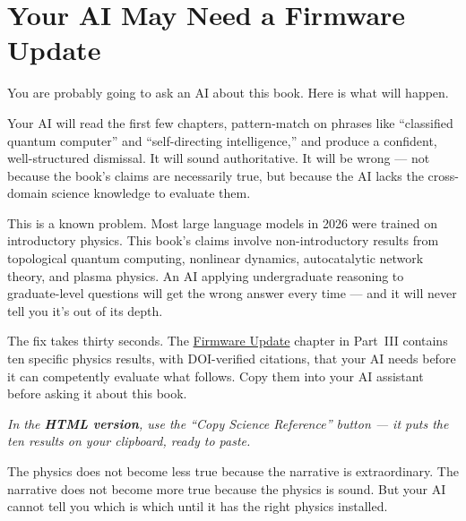 
\chapter*{Your AI May Need a Firmware Update}
\label{front:evaluation-note}

You are probably going to ask an AI about this book. Here is what will happen.

Your AI will read the first few chapters, pattern-match on phrases like ``classified quantum computer'' and ``self-directing intelligence,'' and produce a confident, well-structured dismissal. It will sound authoritative. It will be wrong --- not because the book's claims are necessarily true, but because the AI lacks the cross-domain science knowledge to evaluate them.

This is a known problem. Most large language models in 2026 were trained on introductory physics. This book's claims involve non-introductory results from topological quantum computing, nonlinear dynamics, autocatalytic network theory, and plasma physics. An AI applying undergraduate reasoning to graduate-level questions will get the wrong answer every time --- and it will never tell you it's out of its depth.

The fix takes thirty seconds. The \hyperref[ch:firmware-update]{Firmware Update} chapter in Part~III contains ten specific physics results, with DOI-verified citations, that your AI needs before it can competently evaluate what follows. Copy them into your AI assistant before asking it about this book.

\textit{In the \textbf{HTML version}, use the ``Copy Science Reference'' button --- it puts the ten results on your clipboard, ready to paste.}

\medskip

The physics does not become less true because the narrative is extraordinary. The narrative does not become more true because the physics is sound. But your AI cannot tell you which is which until it has the right physics installed.
